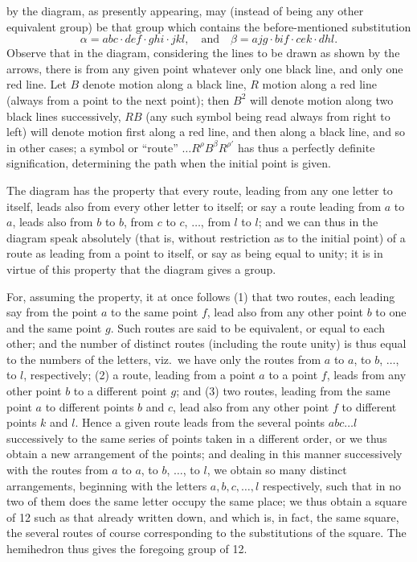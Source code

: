 \documentclass[11pt,a4paper]{article}
\begin{document}
\newpage


\noindent by the diagram, as presently appearing, may (instead of being any other equivalent group) be that group which contains the before-mentioned substitution
\[
\alpha = abc\cdot def\cdot ghi\cdot jkl,\quad \text{and}\quad \beta = ajg\cdot bif\cdot cek\cdot dhl.
\]
Observe that in the diagram, considering the lines to be drawn as shown by the arrows, there is from any given point whatever only one black line, and only one red line. Let $B$ denote motion along a black line, $R$ motion along a red line (always from a point to the next point); then $B^{2}$ will denote motion along two black lines successively, $RB$ (any such symbol being read always from right to left) will denote motion first along a red line, and then along a black line, and so in other cases; a symbol or ``route'' $\ldots R^{\rho}B^{\beta}R^{\rho'}$ has thus a perfectly definite signification, determining the path when the initial point is given.

\medskip

The diagram has the property that every route, leading from any one letter to itself, leads also from every other letter to itself; or say a route leading from $a$ to $a$, leads also from $b$ to $b$, from $c$ to $c$, $\ldots$, from $l$ to $l$; and we can thus in the diagram speak absolutely (that is, without restriction as to the initial point) of a route as leading from a point to itself, or say as being equal to unity; it is in virtue of this property that the diagram gives a group.

\medskip

For, assuming the property, it at once follows (1) that two routes, each leading say from the point $a$ to the same point $f$, lead also from any other point $b$ to one and the same point $g$. Such routes are said to be equivalent, or equal to each other; and the number of distinct routes (including the route unity) is thus equal to the numbers of the letters, viz.\ we have only the routes from $a$ to $a$, to $b$, $\ldots$, to $l$, respectively; (2) a route, leading from a point $a$ to a point $f$, leads from any other point $b$ to a different point $g$; and (3) two routes, leading from the same point $a$ to different points $b$ and $c$, lead also from any other point $f$ to different points $k$ and $l$. Hence a given route leads from the several points $abc\ldots l$ successively to the same series of points taken in a different order, or we thus obtain a new arrangement of the points; and dealing in this manner successively with the routes from $a$ to $a$, to $b$, $\ldots$, to $l$, we obtain so many distinct arrangements, beginning with the letters $a, b, c, \ldots, l$ respectively, such that in no two of them does the same letter occupy the same place; we thus obtain a square of 12 such as that already written down, and which is, in fact, the same square, the several routes of course corresponding to the substitutions of the square. The hemihedron thus gives the foregoing group of 12.
\end{document}
